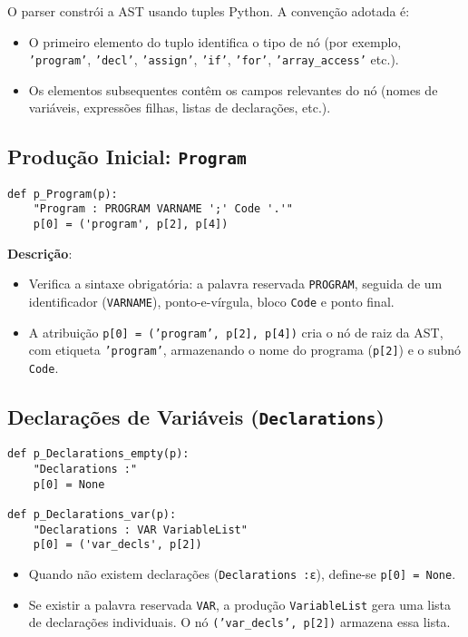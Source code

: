 O parser constrói a AST usando tuples Python. A convenção adotada é:
\begin{itemize}
    \item O primeiro elemento do tuplo identifica o tipo de nó (por exemplo, \texttt{'program'}, \texttt{'decl'}, \texttt{'assign'}, \texttt{'if'}, \texttt{'for'}, \texttt{'array\_access'} etc.).
    \item Os elementos subsequentes contêm os campos relevantes do nó (nomes de variáveis, expressões filhas, listas de declarações, etc.).
\end{itemize}

\subsection{Produção Inicial: \texttt{Program}}

\begin{verbatim}
def p_Program(p):
    "Program : PROGRAM VARNAME ';' Code '.'"
    p[0] = ('program', p[2], p[4])
\end{verbatim}

\noindent

\textbf{Descrição}:
\begin{itemize}
    \item Verifica a sintaxe obrigatória: a palavra reservada \texttt{PROGRAM}, seguida de um identificador (\texttt{VARNAME}), ponto-e-vírgula, bloco \texttt{Code} e ponto final.
    \item A atribuição \texttt{p[0] = ('program', p[2], p[4])} cria o nó de raiz da AST, com etiqueta \texttt{'program'}, armazenando o nome do programa (\texttt{p[2]}) e o subnó \texttt{Code}.
\end{itemize}

\subsection{Declarações de Variáveis (\texttt{Declarations})}

\begin{verbatim}
def p_Declarations_empty(p):
    "Declarations :"
    p[0] = None

def p_Declarations_var(p):
    "Declarations : VAR VariableList"
    p[0] = ('var_decls', p[2])
\end{verbatim}

\noindent

\begin{itemize}
    \item Quando não existem declarações (\texttt{Declarations :ε}), define-se \texttt{p[0] = None}.
    \item Se existir a palavra reservada \texttt{VAR}, a produção \texttt{VariableList} gera uma lista de declarações individuais. O nó \texttt{('var\_decls', p[2])} armazena essa lista.
\end{itemize}

